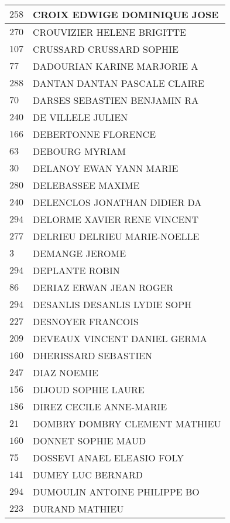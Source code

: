 \begin{xltabular}{\linewidth}{|l|X|}
    \hline
    $258$ & CROIX EDWIGE DOMINIQUE JOSE \\
    \hline
    $270$ & CROUVIZIER HELENE BRIGITTE \\
    \hline
    $107$ & CRUSSARD CRUSSARD SOPHIE \\
    \hline
    $77$ & DADOURIAN KARINE MARJORIE A \\
    \hline
    $288$ & DANTAN DANTAN PASCALE CLAIRE \\
    \hline
    $70$ & DARSES SEBASTIEN BENJAMIN RA \\
    \hline
    $240$ & DE VILLELE JULIEN \\
    \hline
    $166$ & DEBERTONNE FLORENCE \\
    \hline
    $63$ & DEBOURG MYRIAM \\
    \hline
    $30$ & DELANOY EWAN YANN MARIE \\
    \hline
    $280$ & DELEBASSEE MAXIME \\
    \hline
    $240$ & DELENCLOS JONATHAN DIDIER DA \\
    \hline
    $294$ & DELORME XAVIER RENE VINCENT \\
    \hline
    $277$ & DELRIEU DELRIEU MARIE-NOELLE \\
    \hline
    $3$ & DEMANGE JEROME \\
    \hline
    $294$ & DEPLANTE ROBIN \\
    \hline
    $86$ & DERIAZ ERWAN JEAN ROGER \\
    \hline
    $294$ & DESANLIS DESANLIS LYDIE SOPH \\
    \hline
    $227$ & DESNOYER FRANCOIS \\
    \hline
    $209$ & DEVEAUX VINCENT DANIEL GERMA \\
    \hline
    $160$ & DHERISSARD SEBASTIEN \\
    \hline
    $247$ & DIAZ NOEMIE \\
    \hline
    $156$ & DIJOUD SOPHIE LAURE \\
    \hline
    $186$ & DIREZ CECILE ANNE-MARIE \\
    \hline
    $21$ & DOMBRY DOMBRY CLEMENT MATHIEU \\
    \hline
    $160$ & DONNET SOPHIE MAUD \\
    \hline
    $75$ & DOSSEVI ANAEL ELEASIO FOLY \\
    \hline
    $141$ & DUMEY LUC BERNARD \\
    \hline
    $294$ & DUMOULIN ANTOINE PHILIPPE BO \\
    \hline
    $223$ & DURAND MATHIEU \\

\end{xltabular}
